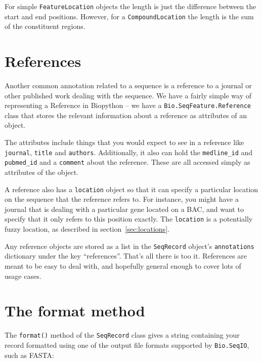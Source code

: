 \documentclass{report}
\begin{document}
For simple \verb|FeatureLocation| objects the length is just
the difference between the start and end positions. However,
for a \verb|CompoundLocation| the length is the sum of the
constituent regions.

\section{References}

Another common annotation related to a sequence is a reference to a journal or other published work dealing with the sequence. We have a fairly simple way of representing a Reference in Biopython -- we have a \verb|Bio.SeqFeature.Reference| class that stores the relevant information about a reference as attributes of an object.

The attributes include things that you would expect to see in a reference like \verb|journal|, \verb|title| and \verb|authors|. Additionally, it also can hold the \verb|medline_id| and \verb|pubmed_id| and a \verb|comment| about the reference. These are all accessed simply as attributes of the object.

A reference also has a \verb|location| object so that it can specify a particular location on the sequence that the reference refers to. For instance, you might have a journal that is dealing with a particular gene located on a BAC, and want to specify that it only refers to this position exactly. The \verb|location| is a potentially fuzzy location, as described in section~\ref{sec:locations}.

Any reference objects are stored as a list in the \verb|SeqRecord| object's \verb|annotations| dictionary under the key ``references''.
That's all there is too it. References are meant to be easy to deal with, and hopefully general enough to cover lots of usage cases.

\section{The format method}
\label{sec:SeqRecord-format}

The \verb|format()| method of the \verb|SeqRecord| class gives a string
containing your record formatted using one of the output file formats
supported by \verb|Bio.SeqIO|, such as FASTA:
\end{document}
